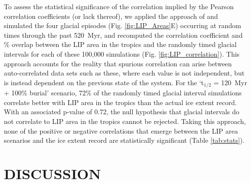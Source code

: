 \documentclass[11pt,letterpaper]{article}
\begin{document}
To assess the statistical significance of the correlation implied by the Pearson correlation coefficients (or lack thereof), we applied the approach of \citet{Macdonald2019a} and simulated the four glacial episodes (Fig. \ref{fig:LIP_Areas}E) occurring at random times through the past 520~Myr, and recomputed the correlation coefficient and \% overlap between the LIP area in the tropics and the randomly timed glacial intervals for each of these 100,000 simulations (Fig. \ref{fig:LIP_correlation}). This approach accounts for the reality that spurious correlation can arise between auto-correlated data sets such as these, where each value is not independent, but is instead dependent on the previous state of the system. For the `t$_{1/2}$ = 120~Myr + 100\% burial' scenario, 72\% of the randomly timed glacial interval simulations correlate better with LIP area in the tropics than the actual ice extent record. With an associated p-value of 0.72, the null hypothesis that glacial intervals do not correlate to LIP area in the tropics cannot be rejected. Taking this approach, none of the positive or negative correlations that emerge between the LIP area scenarios and the ice extent record are statistically significant (Table \ref{tab:stats}).

\section*{DISCUSSION}
\end{document}
